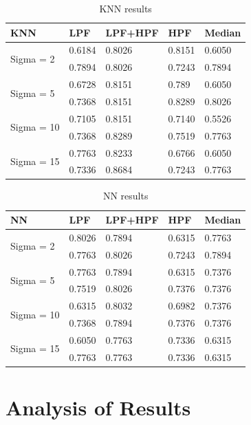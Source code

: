 \documentclass[conference]{IEEEtran}
\begin{document}
\begin{table}[h!]
\centering
\begin{tabular}{ |p{1.4cm}||p{1.1cm}|p{1.3cm}|p{1.1cm}|p{1cm}|  }
\hline
 KNN & LPF &LPF+HPF &HPF & Median\\
 \hline
 \multirow{2}{*}{Sigma = 2} & 0.6184 & 0.8026 & 0.8151  & 0.6050 \\ 
& 0.7894 &  0.8026 & 0.7243 & 0.7894 \\
\hline
\multirow{2}{*}{Sigma = 5} & 0.6728 & 0.8151 & 0.789  & 0.6050  \\ 
 &0.7368 &  0.8151 & 0.8289 &  0.8026 \\ 
\hline
\multirow{2}{*}{Sigma = 10} & 0.7105 & 0.8151 & 0.7140  & 0.5526  \\
& 0.7368 &  0.8289 & 0.7519 &  0.7763 \\
\hline
\multirow{2}{*}{Sigma = 15} & 0.7763  & 0.8233  & 0.6766 & 0.6050 \\
& 0.7336 &  0.8684 & 0.7243 &  0.7763 \\
 \hline
\end{tabular}
\caption{KNN results}
\label{table:2}
\end{table}
\begin{table}[h!]
\centering
\begin{tabular}{ |p{1.4cm}||p{1.1cm}|p{1.3cm}|p{1.1cm}|p{1cm}|  }
\hline
NN & LPF &LPF+HPF &HPF & Median\\
 \hline
 \multirow{2}{*}{Sigma = 2} & 0.8026  & 0.7894  & 0.6315& 0.7763  \\
 & 0.7763 &  0.8026 & 0.7243 &  0.7894 \\
\hline
\multirow{2}{*}{Sigma = 5} & 0.7763 & 0.7894 & 0.6315& 0.7376  \\
 &  0.7519 & 0.8026 &  0.7376 & 0.7376 \\
\hline
\multirow{2}{*}{Sigma = 10}  & 0.6315& 0.8032  & 0.6982 & 0.7376\\
 & 0.7368 & 0.7894 & 0.7376 & 0.7376 \\
\hline
\multirow{2}{*}{Sigma = 15} & 0.6050 & 0.7763 & 0.7336 & 0.6315 \\
&  0.7763 &  0.7763 & 0.7336 &  0.6315 \\
 \hline
\end{tabular}
\caption{NN results}
\label{table:3}
\end{table}

\section{Analysis of Results}\label{analysis}
\end{document}
